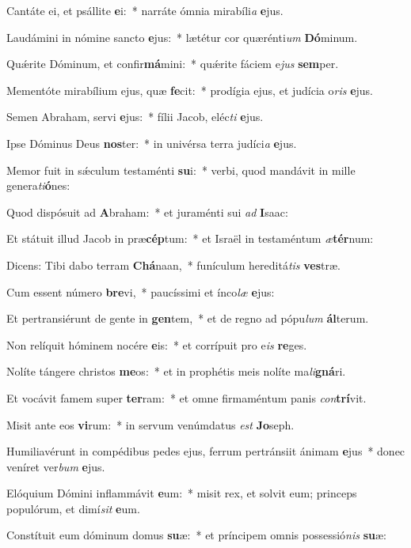 \item Cantáte ei, et psállite \textbf{e}i:~* narráte ómnia mirabíli\textit{a} \textbf{e}jus.
\item Laudámini in nómine sancto \textbf{e}jus:~* lætétur cor quærénti\textit{um} \textbf{Dó}minum.
\item Quǽrite Dóminum, et confir\textbf{má}mini:~* quǽrite fáciem e\textit{jus} \textbf{sem}per.
\item Mementóte mirabílium ejus, quæ \textbf{fe}cit:~* prodígia ejus, et judícia o\textit{ris} \textbf{e}jus.
\item Semen Abraham, servi \textbf{e}jus:~* fílii Jacob, eléc\textit{ti} \textbf{e}jus.
\item Ipse Dóminus Deus \textbf{nos}ter:~* in univérsa terra judíci\textit{a} \textbf{e}jus.
\item Memor fuit in sǽculum testaménti \textbf{su}i:~* verbi, quod mandávit in mille genera\textit{ti}\textbf{ó}nes:
\item Quod dispósuit ad \textbf{A}braham:~* et juraménti sui \textit{ad} \textbf{I}saac:
\item Et státuit illud Jacob in præ\textbf{cép}tum:~* et Israël in testaméntum \textit{æ}\textbf{tér}num:
\item Dicens: Tibi dabo terram \textbf{Chá}naan,~* funículum hereditá\textit{tis} \textbf{ves}træ.
\item Cum essent número \textbf{bre}vi,~* paucíssimi et ínco\textit{læ} \textbf{e}jus:
\item Et pertransiérunt de gente in \textbf{gen}tem,~* et de regno ad pópu\textit{lum} \textbf{ál}terum.
\item Non relíquit hóminem nocére \textbf{e}is:~* et corrípuit pro e\textit{is} \textbf{re}ges.
\item Nolíte tángere christos \textbf{me}os:~* et in prophétis meis nolíte ma\textit{li}\textbf{gná}ri.
\item Et vocávit famem super \textbf{ter}ram:~* et omne firmaméntum panis \textit{con}\textbf{trí}vit.
\item Misit ante eos \textbf{vi}rum:~* in servum venúmdatus \textit{est} \textbf{Jo}seph.
\item Humiliavérunt in compédibus pedes ejus, ferrum pertránsiit ánimam \textbf{e}jus~* donec veníret ver\textit{bum} \textbf{e}jus.
\item Elóquium Dómini inflammávit \textbf{e}um:~* misit rex, et solvit eum; princeps populórum, et dimí\textit{sit} \textbf{e}um.
\item Constítuit eum dóminum domus \textbf{su}æ:~* et príncipem omnis possessió\textit{nis} \textbf{su}æ:
